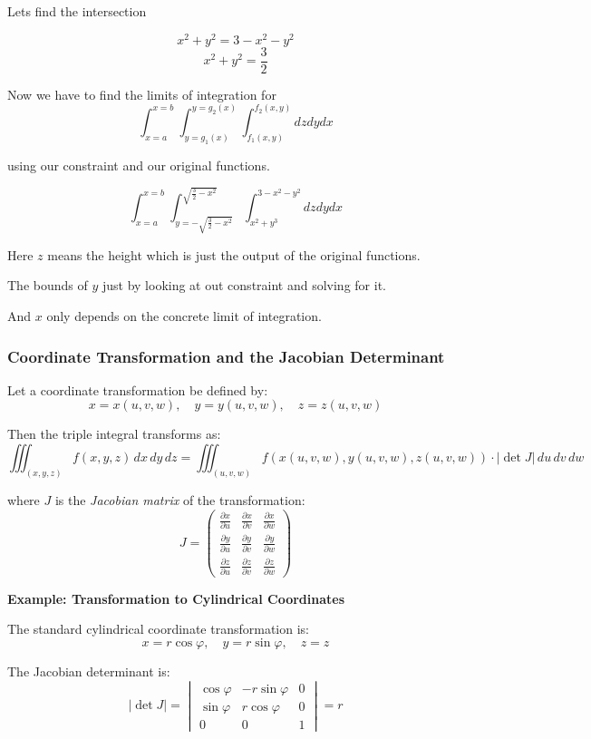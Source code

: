 Lets find the intersection

\[
x^2 + y^2 = 3 -x^2 - y^2 
\]
\[
x^2 + y^2 = \frac{3}{2}
\]

Now we have to find the limits of integration for 
\[
\int_{x=a}^{x=b}\int_{y=g_1(x)}^{y=g_2(x)} \int_{f_1(x,y)}^{f_2(x,y)} dz dy dx
\]

using our constraint and our original functions.

\[
\int_{x=a}^{x=b}\int_{y=-\sqrt{\frac{3}{2} - x^2}}^{\sqrt{\frac{3}{2} -x^2}} \int_{x^2 + y^3}^{3-x^2-y^2} dz dy dx
\]

Here \(z\) means the height which is just the output
of the original functions.

The bounds of \(y\) just by looking at out constraint and solving for it.

And \(x\) only depends on the concrete limit of integration.


\subsubsection{Coordinate Transformation and the Jacobian Determinant}

Let a coordinate transformation be defined by:
\[
x = x(u, v, w), \quad y = y(u, v, w), \quad z = z(u, v, w)
\]

Then the triple integral transforms as:
\[
\iiint_{(x, y, z)} f(x, y, z)\, dx\, dy\, dz = \iiint_{(u, v, w)} f(x(u, v, w), y(u, v, w), z(u, v, w)) \cdot \left| \det J \right|\, du\, dv\, dw
\]

where \( J \) is the \emph{Jacobian matrix} of the transformation:
\[
J = 
\begin{pmatrix}
\frac{\partial x}{\partial u} & \frac{\partial x}{\partial v} & \frac{\partial x}{\partial w} \\
\frac{\partial y}{\partial u} & \frac{\partial y}{\partial v} & \frac{\partial y}{\partial w} \\
\frac{\partial z}{\partial u} & \frac{\partial z}{\partial v} & \frac{\partial z}{\partial w}
\end{pmatrix}
\]

\textbf{Example: Transformation to Cylindrical Coordinates}

The standard cylindrical coordinate transformation is:
\[
x = r \cos \varphi, \quad y = r \sin \varphi, \quad z = z
\]

The Jacobian determinant is:
\[
\left| \det J \right| =
\begin{vmatrix}
\cos \varphi & -r \sin \varphi & 0 \\
\sin \varphi & r \cos \varphi & 0 \\
0 & 0 & 1
\end{vmatrix}
= r
\]

